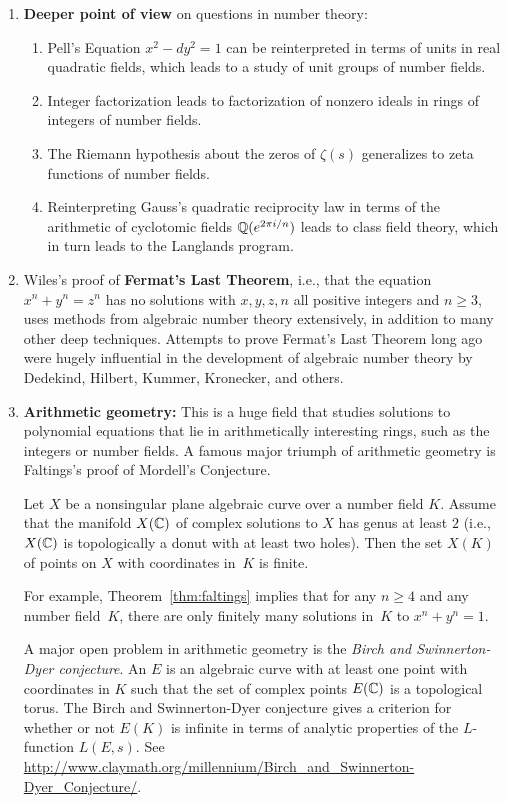 \begin{enumerate}
\item {\bf Deeper point of view} on questions in number theory:
\begin{enumerate}
\item Pell's Equation $x^2-dy^2=1$ can be reinterpreted in terms of units in real quadratic fields, which
leads to a study of unit groups of number fields.
\item Integer factorization leads to factorization of nonzero ideals in rings of integers of number fields.
\item The Riemann hypothesis about the zeros of $\zeta(s)$ generalizes to zeta functions of number fields.
\item Reinterpreting Gauss's quadratic reciprocity law in terms of the
  arithmetic of cyclotomic fields $\mathbb{Q}(e^{2\pi i/n})$ leads to class
  field theory, which in turn leads to the Langlands program.
\end{enumerate}
\item Wiles's proof of {\bf Fermat's Last Theorem}, i.e., that the
equation $x^n+y^n=z^n$ has no solutions with $x,y,z,n$ all positive
integers and $n\geq 3$, uses methods from
algebraic number theory extensively, in addition to many other deep
techniques.  Attempts to prove Fermat's Last Theorem long ago were
hugely influential in the development of algebraic number theory
by Dedekind, Hilbert, Kummer, Kronecker, and others.
\item {\bf Arithmetic geometry:} This is a huge field that studies
solutions to polynomial equations that lie in arithmetically
interesting rings, such as the integers or number fields.  A famous
major triumph of arithmetic geometry is Faltings's proof of Mordell's
Conjecture.
\begin{theorem}[Faltings] \label{thm:faltings}
Let $X$ be a nonsingular plane algebraic curve over a number
field $K$.  Assume that the manifold $X(\mathbb{C})$ of complex solutions to
$X$ has genus at least $2$ (i.e., $X(\mathbb{C})$ is topologically a donut
with at least two holes).  Then the set $X(K)$ of points on $X$ with
coordinates in~$K$ is finite.
\end{theorem}
For example, Theorem~\ref{thm:faltings} implies that for any $n\geq 4$
and any number field~$K$, there are only finitely many solutions
in~$K$ to $x^n+y^n=1$.

A major open problem in arithmetic geometry is the {\em Birch
  and Swinnerton-Dyer conjecture}.
An  $E$ is an algebraic curve with at least one point
with coordinates in $K$ such that the set of complex points
$E(\mathbb{C})$ is a topological torus.
The Birch and Swinnerton-Dyer conjecture gives a
criterion for whether or not $E(K)$ is infinite in
terms of analytic properties of the $L$-function $L(E,s)$.
See \url{http://www.claymath.org/millennium/Birch_and_Swinnerton-Dyer_Conjecture/}.

\end{enumerate}


